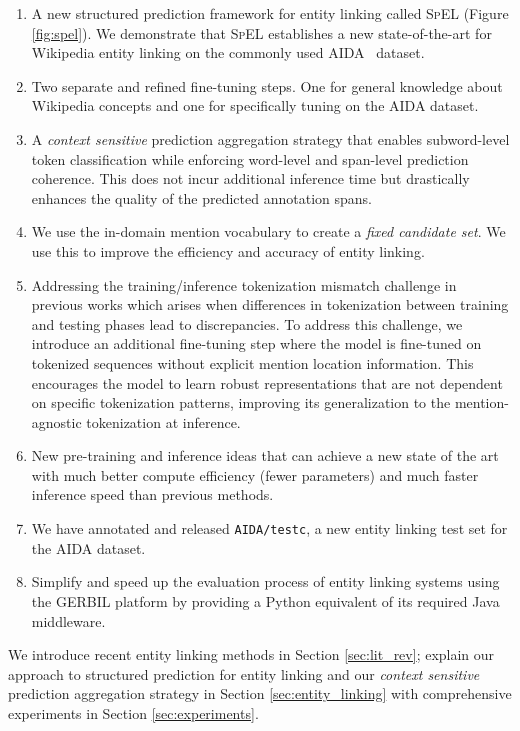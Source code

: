 \documentclass[11pt]{article}
\begin{document}
\begin{enumerate}
    \vspace{-0.8em}
    \itemsep0em 
    \item[(1)] A new structured prediction framework for entity linking called \textsc{SpEL} (Figure \ref{fig:spel}). We demonstrate that \textsc{SpEL} establishes a new state-of-the-art for Wikipedia entity linking on the commonly used AIDA~\cite{D11-1072} dataset.
    \item[(2)] Two separate and refined fine-tuning steps. One for general knowledge about Wikipedia concepts and one for specifically tuning on the AIDA dataset.
    \item[(3)] A \textit{context sensitive} prediction aggregation strategy that enables subword-level token classification while enforcing word-level and span-level prediction coherence. This does not incur additional inference time but drastically enhances the quality of the predicted annotation spans.
    \item[(4)] We use the in-domain mention vocabulary to create a \textit{fixed candidate set}. We use this to improve the efficiency and accuracy of entity linking.
    \item[(5)] Addressing the training/inference tokenization mismatch challenge in previous works which arises when differences in tokenization between training and testing phases lead to discrepancies. To address this challenge, we introduce an additional fine-tuning step where the model is fine-tuned on tokenized sequences without explicit mention location information. This encourages the model to learn robust representations that are not dependent on specific tokenization patterns, improving its generalization to the mention-agnostic tokenization at inference.
    \item[(6)] New pre-training and inference ideas that can achieve a new state of the art with much better compute efficiency (fewer parameters) and much faster inference speed than previous methods.
    \item[(7)] We have annotated and released \texttt{AIDA/testc}, a new entity linking test set for the AIDA dataset.
    \item[(8)] Simplify and speed up the evaluation process of entity linking systems using the GERBIL platform \cite{GERBIL} by providing a Python equivalent of its required Java middleware.
    \vspace{-0.4em}
\end{enumerate}

We introduce recent entity linking methods in Section \ref{sec:lit_rev}; explain our approach to structured prediction for entity linking and our \textit{context sensitive} prediction aggregation strategy in Section \ref{sec:entity_linking} with comprehensive experiments in Section \ref{sec:experiments}.
\end{document}
